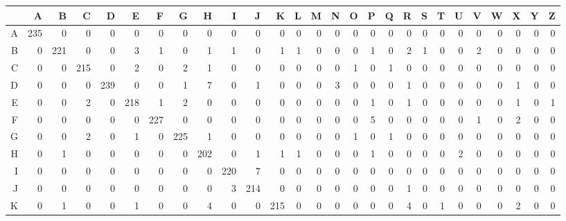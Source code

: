 \begin{table}[ht]
\centering
\begin{adjustbox}{max width=\textwidth}
\begin{tabular}{rrrrrrrrrrrrrrrrrrrrrrrrrrr}
  \hline
 & A & B & C & D & E & F & G & H & I & J & K & L & M & N & O & P & Q & R & S & T & U & V & W & X & Y & Z \\ 
  \hline
A & 235 &   0 &   0 &   0 &   0 &   0 &   0 &   0 &   0 &   0 &   0 &   0 &   0 &   0 &   0 &   0 &   0 &   0 &   0 &   0 &   0 &   0 &   0 &   0 &   0 &   0 \\ 
  B &   0 & 221 &   0 &   0 &   3 &   1 &   0 &   1 &   1 &   0 &   1 &   1 &   0 &   0 &   0 &   1 &   0 &   2 &   1 &   0 &   0 &   2 &   0 &   0 &   0 &   0 \\ 
  C &   0 &   0 & 215 &   0 &   2 &   0 &   2 &   1 &   0 &   0 &   0 &   0 &   0 &   0 &   1 &   0 &   1 &   0 &   0 &   0 &   0 &   0 &   0 &   0 &   0 &   0 \\ 
  D &   0 &   0 &   0 & 239 &   0 &   0 &   1 &   7 &   0 &   1 &   0 &   0 &   0 &   3 &   0 &   0 &   0 &   1 &   0 &   0 &   0 &   0 &   0 &   1 &   0 &   0 \\ 
  E &   0 &   0 &   2 &   0 & 218 &   1 &   2 &   0 &   0 &   0 &   0 &   0 &   0 &   0 &   0 &   1 &   0 &   1 &   0 &   0 &   0 &   0 &   0 &   1 &   0 &   1 \\ 
  F &   0 &   0 &   0 &   0 &   0 & 227 &   0 &   0 &   0 &   0 &   0 &   0 &   0 &   0 &   0 &   5 &   0 &   0 &   0 &   0 &   0 &   1 &   0 &   2 &   0 &   0 \\ 
  G &   0 &   0 &   2 &   0 &   1 &   0 & 225 &   1 &   0 &   0 &   0 &   0 &   0 &   0 &   1 &   0 &   1 &   0 &   0 &   0 &   0 &   0 &   0 &   0 &   0 &   0 \\ 
  H &   0 &   1 &   0 &   0 &   0 &   0 &   0 & 202 &   0 &   1 &   1 &   1 &   0 &   0 &   0 &   1 &   0 &   0 &   0 &   0 &   2 &   0 &   0 &   0 &   0 &   0 \\ 
  I &   0 &   0 &   0 &   0 &   0 &   0 &   0 &   0 & 220 &   7 &   0 &   0 &   0 &   0 &   0 &   0 &   0 &   0 &   0 &   0 &   0 &   0 &   0 &   0 &   0 &   0 \\ 
  J &   0 &   0 &   0 &   0 &   0 &   0 &   0 &   0 &   3 & 214 &   0 &   0 &   0 &   0 &   0 &   0 &   0 &   1 &   0 &   0 &   0 &   0 &   0 &   0 &   0 &   0 \\ 
  K &   0 &   1 &   0 &   0 &   1 &   0 &   0 &   4 &   0 &   0 & 215 &   0 &   0 &   0 &   0 &   0 &   0 &   4 &   0 &   1 &   0 &   0 &   0 &   2 &   0 &   0 \\ 

\end{tabular}
\end{adjustbox}
\end{table}
